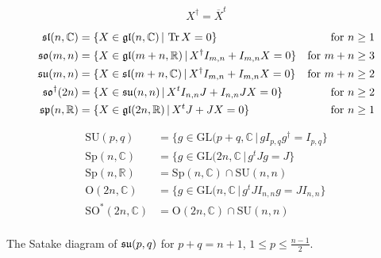 \[X^\dag = \overline{X}^t\]

\begin{equation*}\label{eq:algebras_definition}
\begin{aligned}
 \mathfrak{sl}(n,\mathbb{C}) &= \{ X \in \mathfrak{gl}(n,\mathbb{C}) \,|\, \operatorname{\mathrm{Tr}} X = 0 \} & \text{for } n \geq 1\\
 \mathfrak{so}(m,n)  &= \{ X\in \mathfrak{gl}(m+n,\mathbb{R}) \,|\, X^\dag I_{m,n}+I_{m,n}X = 0 \} & \text{for } m+n\geq 3\\
 \mathfrak{su}(m,n)  &= \{ X \in \mathfrak{sl}(m+n,\mathbb{C})  \,|\, X^\dag I_{m,n}+I_{m,n}X = 0 \} & \text{for } m+n \geq 2\\
 \mathfrak{so}^\dag(2n) &= \{ X \in \mathfrak{su}(n,n) \,|\, X^t I_{n,n}J + I_{n,n} JX = 0 \} & \text{for } n \geq 2\\
 \mathfrak{sp}(n,\mathbb{R}) &= \{ X \in \mathfrak{gl}(2n,\mathbb{R}) \,|\, X^tJ + JX = 0 \} & \text{for } n\geq 1
\end{aligned}
\end{equation*}

\begin{equation*}
\begin{aligned}
\mathrm{SU}(p,q) &= \{ g \in \mathrm{GL}(p +q, \mathbb{C} \,|\, g I_{p,q}g^\dag = I_{p,q} \}\\
\mathrm{Sp}(n, \mathbb{C}) &= \{ g \in \mathrm{GL}(2n, \mathbb{C} \,|\, g^t J g  = J \}\\
\mathrm{Sp}(n, \mathbb{R}) &= \mathrm{Sp}(n, \mathbb{C}) \cap \mathrm{SU}(n,n) \\
\mathrm{O}(2n, \mathbb{C}) &= \{ g \in \mathrm{GL}(n, \mathbb{C} \,|\, g^t JI_{n,n} g  = JI_{n,n} \}\\
\mathrm{SO}^*(2n, \mathbb{C}) &=  \mathrm{O}(2n, \mathbb{C}) \cap \mathrm{SU}(n,n) \\
\end{aligned}
\end{equation*}


The Satake diagram of $\mathfrak{su}(p,q)$ for $p+q = n+1$, $1 \leq p \leq \frac{n-1}{2}$.

